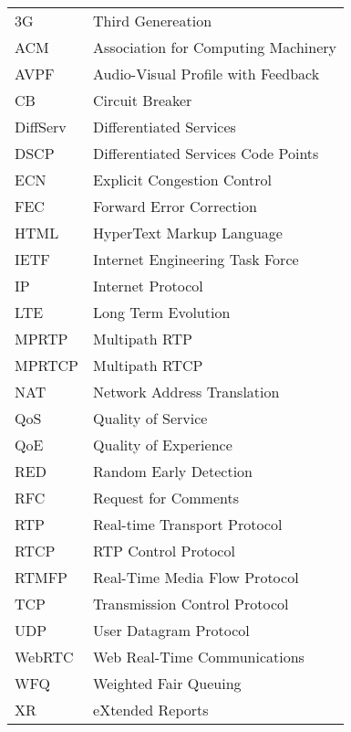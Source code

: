 \begin{longtable}{ll}
3G		& Third Genereation \\
ACM		& Association for Computing Machinery \\
AVPF	& Audio-Visual Profile with Feedback \\
CB		& Circuit Breaker \\
DiffServ	& Differentiated Services \\
DSCP 	& Differentiated Services Code Points \\
ECN		& Explicit Congestion Control \\
FEC		& Forward Error Correction \\
HTML	& HyperText Markup Language \\
IETF	& Internet Engineering Task Force \\
IP		& Internet Protocol \\
LTE 	& Long Term Evolution \\
MPRTP 	& Multipath RTP \\
MPRTCP 	& Multipath RTCP \\
NAT		& Network Address Translation \\
QoS		& Quality of Service \\
QoE		& Quality of Experience \\
RED		& Random Early Detection \\
RFC 	& Request for Comments \\
RTP 	& Real-time Transport Protocol \\
RTCP 	& RTP Control Protocol \\
RTMFP	& Real-Time Media Flow Protocol \\
TCP		& Transmission Control Protocol \\
UDP		& User Datagram Protocol \\
WebRTC 	& Web Real-Time Communications \\
WFQ		& Weighted Fair Queuing \\
XR		& eXtended Reports \\
\end{longtable}

